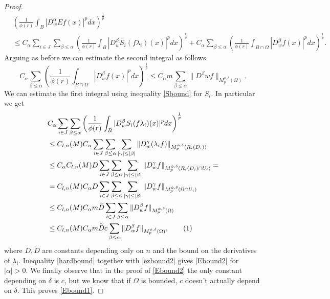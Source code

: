 \documentclass[12pt]{article}
\theoremstyle{definition}
\newcommand\addtag{\refstepcounter{equation}\tag{\theequation}}
\begin{document}
\begin{proof}
\begin{align*}
&\left( \frac{1}{\phi(r)} \int_B |D^\alpha_w Ef(x)|^pdx \right)^\frac{1}{p} \\
&\le C_\alpha\sum_{i\in J}\sum_{\beta\le \alpha}  \left( \frac{1}{\phi(r)} \int_B |D^\beta_wS_i(f\lambda_i)(x)|^pdx \right)^\frac{1}{p} +C_\alpha \sum_{\beta\le \alpha}  \left( \frac{1}{\phi(r)} \int_{B\cap\Omega} |D^\beta_w f(x)|^pdx \right)^\frac{1}{p}.
\end{align*}
Arguing as before we can estimate the second integral as follows
\begin{equation}
C_\alpha \sum_{\beta\le \alpha}  \left( \frac{1}{\phi(r)} \int_{B\cap\Omega} |D^\beta_w f(x)|^pdx \right)^\frac{1}{p}\le  C_\alpha m\sum_{\beta\le \alpha}  \| D^\beta wf\|_{M_p^{\phi,\delta}(\Omega)}. \label{ezbound2}
\end{equation}
We can estimate the first integral using inequality \eqref{Sbound} for $S_i$. In particular we get
\begin{align*}
&C_\alpha\sum_{i\in J}\sum_{\beta\le \alpha}  \left( \frac{1}{\phi(r)} \int_B |D^\beta_wS_i(f\lambda_i)(x)|^pdx \right)^\frac{1}{p} \\
& \le C_{l,n}(M) C_\alpha\sum_{i\in J}\sum_{\beta\le \alpha}\sum_{|\gamma|\le |\beta|} \| D^\gamma_w(\lambda_if)\|_{M_p^{\phi,\delta}(R_i(D_i))} \\
&\le C_\alpha C_{l,n}(M) D\sum_{i\in J}\sum_{\beta\le \alpha}\sum_{|\gamma|\le |\beta|} \| D^\gamma_wf\|_{M_p^{\phi,\delta}(R_i(D_i)\cap U_i)}= \\
&= C_{l,n}(M)C_\alpha D\sum_{i\in J}\sum_{\beta\le \alpha}\sum_{|\gamma|\le |\beta|} \| D^\gamma_wf\|_{M_p^{\phi,\delta}(\Omega\cap U_i)} \\
&\le C_{l,n}(M)C_\alpha m \widetilde D\sum_{i\in J} \sum_{\beta\le \alpha}\| D^\beta_wf\|_{M_p^{\phi,\delta}(\Omega)} \\
&\le C_{l,n}(M) C_\alpha m \widetilde Dc\sum_{\beta\le \alpha}\| D^\beta_wf\|_{M_p^{\phi,\delta}(\Omega)}, \addtag \label{hardbound}
\end{align*}
where $D,\widetilde D$ are constants depending only on $n$ and the bound on the derivatives of $\lambda_i.$ Inequality \eqref{hardbound} together with \eqref{ezbound2} gives \eqref{Ebound2} for $|\alpha|>0.$ We finally observe that in the proof of \eqref{Ebound2} the only constant depending on $\delta$ is $c$, but we know that if $\Omega$ is bounded, $c$ doesn't actually depend on $\delta$. This proves \eqref{Ebound1}.

\end{proof}


\end{document}
